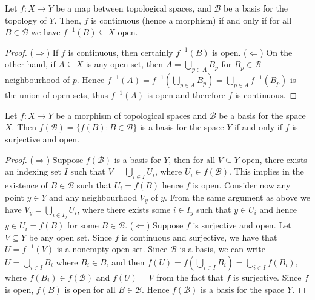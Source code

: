 \begin{proposition}
Let \(f: X \to Y\) be a map between topological spaces, and \(\mathcal B\) be
a basis for the topology of \(Y\). Then, \(f\) is continuous (hence a
morphism) if and only if for all \(B \in \mathcal B\) we have \(f^{-1}(B)
\subseteq X\) open.
\end{proposition}

\begin{proof}
(\(\Rightarrow\)) If \(f\) is continuous, then certainly \(f^{-1}(B)\) is
open. (\(\Leftarrow\)) On the other hand, if \(A \subseteq X\) is any open
set, then \(A = \bigcup_{p \in A} B_p\) for \(B_p \in \mathcal B\)
neighbourhood of \(p\). Hence \(f^{-1}(A) = f^{-1} (\bigcup_{p \in A}
B_p) = \bigcup_{p \in A} f^{-1}(B_p)\) is the union of open sets, thus
\(f^{-1}(A)\) is open and therefore \(f\) is continuous.
\end{proof}

\begin{proposition}\label{prop: basis image surjective}
Let \(f: X \to Y\) be a morphism of topological spaces and \(\mathcal B\) be a
basis for the space \(X\). Then \(f(\mathcal B) = \{f(B) \colon B \in \mathcal
B\}\) is a basis for the space \(Y\) if and only if \(f\) is surjective and
open.
\end{proposition}

\begin{proof}
(\(\Rightarrow\)) Suppose \(f(\mathcal B)\) is a basis for \(Y\), then for all
\(V \subseteq Y\) open, there exists an indexing set \(I\) such that \(V =
\bigcup_{i \in  I} U_i\), where \(U_i \in f(\mathcal B)\). This implies in the
existence of \(B \in \mathcal B\) such that \(U_i = f(B)\) hence \(f\) is
open. Consider now any point \(y \in Y\) and any neighbourhood \(V_y\) of
\(y\). From the same argument as above we have \(V_y = \bigcup_{i \in  I_y}
U_i\), where there exists some \(i \in I_y\) such that \(y \in U_i\) and hence
\(y \in U_i = f(B)\) for some \(B \in \mathcal B\).
(\(\Leftarrow\)) Suppose \(f\) is surjective and open. Let \(V \subseteq Y\)
be any open set. Since \(f\) is continuous and surjective, we have that
\(U = f^{-1}(V)\) is a nonempty open set. Since \(\mathcal B\) is a basis, we
can write \(U = \bigcup_{i \in  I} B_i\) where \(B_i \in B\), and then \(f(U)
= f\left( \bigcup_{i \in  I} B_i \right) = \bigcup_{i \in I} f(B_i)\), where
\(f(B_i) \in f(\mathcal B)\) and \(f(U) = V\) from the fact that \(f\) is
surjective. Since \(f\) is open, \(f(B)\) is open for all \(B \in \mathcal
B\). Hence \(f(\mathcal B)\) is a basis for the space \(Y\).
\end{proof}

